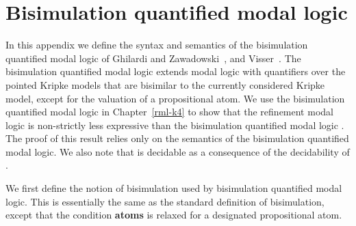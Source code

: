\chapter{Bisimulation quantified modal logic}\label{bqml}

In this appendix we define the syntax and semantics of the bisimulation quantified modal logic of Ghilardi and Zawadowski~\cite{ghilardi:2002}, and Visser~\cite{visser:1996}.
The bisimulation quantified modal logic extends modal logic with quantifiers over the pointed Kripke models that are bisimilar to the currently considered Kripke model, except for the valuation of a propositional atom.
We use the bisimulation quantified modal logic in Chapter~\ref{rml-k4} to show that the refinement modal logic \logicRmlKF{} is non-strictly less expressive than the bisimulation quantified modal logic \logicBqmlKF{}.
The proof of this result relies only on the semantics of the bisimulation quantified modal logic.
We also note that \logicRmlKF{} is decidable as a consequence of the decidability of \logicBqmlKF{}.

We first define the notion of bisimulation used by bisimulation quantified modal logic.
This is essentially the same as the standard definition of bisimulation, except that the condition {\bf atoms} is relaxed for a designated propositional atom.

